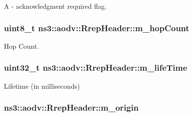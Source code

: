 A -\/ acknowledgment required flag. 

\subsubsection[{\texorpdfstring{m\+\_\+hop\+Count}{m_hopCount}}]{\setlength{\rightskip}{0pt plus 5cm}uint8\+\_\+t ns3\+::aodv\+::\+Rrep\+Header\+::m\+\_\+hop\+Count\hspace{0.3cm}{\ttfamily [private]}}\hypertarget{classns3_1_1aodv_1_1RrepHeader_ac0cd2013d6975e4a8668dd831d488ab3}{}\label{classns3_1_1aodv_1_1RrepHeader_ac0cd2013d6975e4a8668dd831d488ab3}


Hop Count. 

\subsubsection[{\texorpdfstring{m\+\_\+life\+Time}{m_lifeTime}}]{\setlength{\rightskip}{0pt plus 5cm}uint32\+\_\+t ns3\+::aodv\+::\+Rrep\+Header\+::m\+\_\+life\+Time\hspace{0.3cm}{\ttfamily [private]}}\hypertarget{classns3_1_1aodv_1_1RrepHeader_aed5f49edff52cee3f48713ef5f0bc8a2}{}\label{classns3_1_1aodv_1_1RrepHeader_aed5f49edff52cee3f48713ef5f0bc8a2}


Lifetime (in milliseconds) 

\subsubsection[{\texorpdfstring{m\+\_\+origin}{m_origin}}]{ ns3\+::aodv\+::\+Rrep\+Header\+::m\+\_\+origin\hspace{0.3cm}{\ttfamily [private]}}\hypertarget{classns3_1_1aodv_1_1RrepHeader_ae9cb0d9d6a1ee8dd41603ed7c1128532}{}\label{classns3_1_1aodv_1_1RrepHeader_ae9cb0d9d6a1ee8dd41603ed7c1128532}


